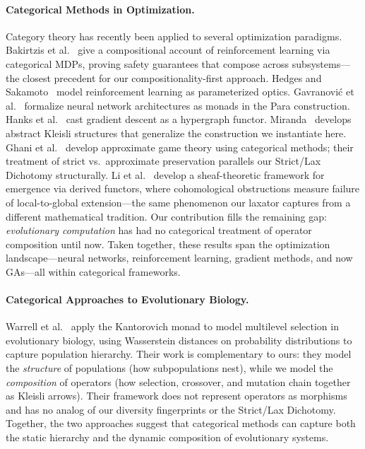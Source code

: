 \documentclass[sigconf,anonymous]{acmart}
\begin{document}
\paragraph{Categorical Methods in Optimization.}
Category theory has recently been applied to several optimization paradigms.
Bakirtzis et al.~\cite{bakirtzis2024compositional} give a compositional account of reinforcement learning via categorical MDPs, proving safety guarantees that compose across subsystems---the closest precedent for our compositionality-first approach.
Hedges and Sakamoto~\cite{hedges2024reinforcement} model reinforcement learning as parameterized optics.
Gavranovi\'{c} et al.~\cite{gavranovic2024categorical} formalize neural network architectures as monads in the Para construction.
Hanks et al.~\cite{hanks2024gradient} cast gradient descent as a hypergraph functor.
Miranda~\cite{miranda2024abstract} develops abstract Kleisli structures that generalize the construction we instantiate here.
Ghani et al.~\cite{ghani2025approximate} develop approximate game theory using categorical methods; their treatment of strict vs.\ approximate preservation parallels our Strict/Lax Dichotomy structurally.
Li et al.~\cite{li2023emergence} develop a sheaf-theoretic framework for emergence via derived functors, where cohomological obstructions measure failure of local-to-global extension---the same phenomenon our laxator captures from a different mathematical tradition.
Our contribution fills the remaining gap: \emph{evolutionary computation} has had no categorical treatment of operator composition until now. Taken together, these results span the optimization landscape---neural networks, reinforcement learning, gradient methods, and now GAs---all within categorical frameworks.

\paragraph{Categorical Approaches to Evolutionary Biology.}
Warrell et al.~\cite{warrell2024kantorovich} apply the Kantorovich monad to model multilevel selection in evolutionary biology, using Wasserstein distances on probability distributions to capture population hierarchy.
Their work is complementary to ours: they model the \emph{structure} of populations (how subpopulations nest), while we model the \emph{composition} of operators (how selection, crossover, and mutation chain together as Kleisli arrows).
Their framework does not represent operators as morphisms and has no analog of our diversity fingerprints or the Strict/Lax Dichotomy.
Together, the two approaches suggest that categorical methods can capture both the static hierarchy and the dynamic composition of evolutionary systems.
\end{document}
